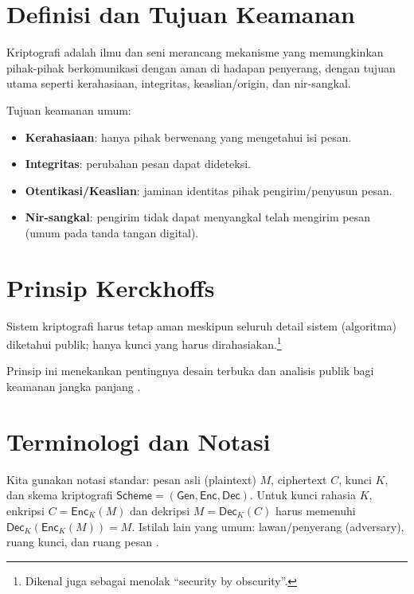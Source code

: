 \documentclass[../main.tex]{subfiles}
\begin{document}
\section{Definisi dan Tujuan Keamanan}
\begin{definition}[Kriptografi]
Kriptografi adalah ilmu dan seni merancang mekanisme yang memungkinkan pihak-pihak berkomunikasi dengan aman di hadapan penyerang, dengan tujuan utama seperti kerahasiaan, integritas, keaslian/origin, dan nir-sangkal.
\end{definition}

Tujuan keamanan umum:
\begin{itemize}
  \item \textbf{Kerahasiaan}: hanya pihak berwenang yang mengetahui isi pesan.
  \item \textbf{Integritas}: perubahan pesan dapat dideteksi.
  \item \textbf{Otentikasi/Keaslian}: jaminan identitas pihak pengirim/penyusun pesan.
  \item \textbf{Nir-sangkal}: pengirim tidak dapat menyangkal telah mengirim pesan (umum pada tanda tangan digital).
\end{itemize}

\section{Prinsip Kerckhoffs}
\begin{definition}
Sistem kriptografi harus tetap aman meskipun seluruh detail sistem (algoritma) diketahui publik; hanya kunci yang harus dirahasiakan.\footnote{Dikenal juga sebagai menolak ``security by obscurity''.}
\end{definition}
Prinsip ini menekankan pentingnya desain terbuka dan analisis publik bagi keamanan jangka panjang \citep{kerckhoffs1883,katzlindell,bonehshoup}.

\section{Terminologi dan Notasi}
Kita gunakan notasi standar: pesan asli (plaintext) \(M\), ciphertext \(C\), kunci \(K\), dan skema kriptografi \(\mathsf{Scheme}=(\mathsf{Gen},\mathsf{Enc},\mathsf{Dec})\). Untuk kunci rahasia \(K\), enkripsi \(C=\mathsf{Enc}_K(M)\) dan dekripsi \(M=\mathsf{Dec}_K(C)\) harus memenuhi \(\mathsf{Dec}_K(\mathsf{Enc}_K(M))=M\). Istilah lain yang umum: lawan/penyerang (adversary), ruang kunci, dan ruang pesan \citep{rfc4949,katzlindell}.
\end{document}
